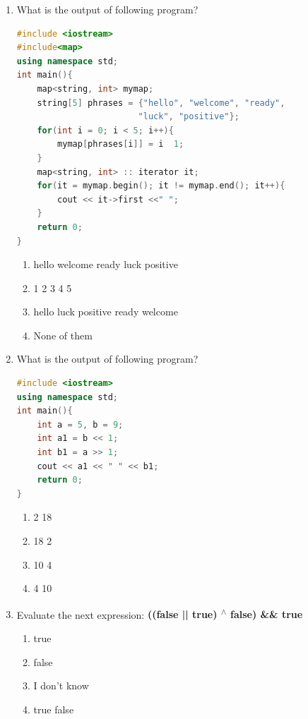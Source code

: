 \documentclass[10pt]{article}
\begin{document}
\begin{enumerate}
\item What is the output of following program?
\begin{lstlisting}[language=C++]
#include <iostream>
#include<map>
using namespace std;
int main(){
    map<string, int> mymap;
    string[5] phrases = {"hello", "welcome", "ready", 
                        "luck", "positive"};
    for(int i = 0; i < 5; i++){
        mymap[phrases[i]] = i  1;
    }
    map<string, int> :: iterator it;
    for(it = mymap.begin(); it != mymap.end(); it++){
        cout << it->first <<" ";
    }
    return 0;
}

\end{lstlisting}
\begin{enumerate}
    \item hello welcome ready luck positive
    \item 1 2 3 4 5
    \item hello luck positive ready welcome 
    \item None of them
\end{enumerate}



\item What is the output of following program?
\begin{lstlisting}[language=C++]
#include <iostream>
using namespace std;
int main(){
    int a = 5, b = 9;
    int a1 = b << 1;
    int b1 = a >> 1;
    cout << a1 << " " << b1;
    return 0;
}
\end{lstlisting}
\begin{multicols}{4}
\begin{enumerate}
    \item 2 18
    \item 18 2 
    \item 10 4
    \item 4 10
\end{enumerate}
\end{multicols}


\item Evaluate the next expression: \textbf{((false || true) \textsuperscript{$\wedge$} false) \&\& true}
\begin{multicols}{4}
\begin{enumerate}
    \item true 
    \item false
    \item I don't know
    \item true false
\end{enumerate}
\end{multicols}



\end{enumerate}
\end{document}
